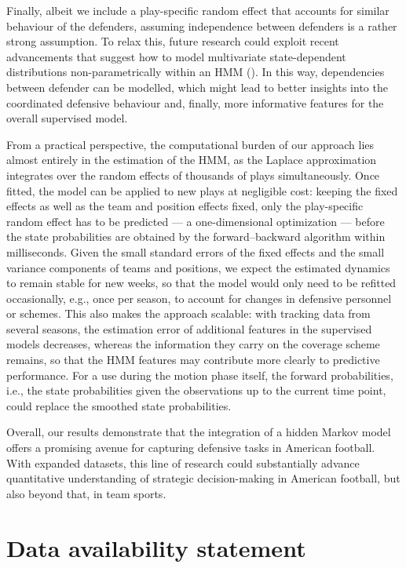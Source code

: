 \documentclass[namedate,webpdf,modern,medium]{oup-authoring-template}
\begin{document}
Finally, albeit we include a play-specific random effect that accounts for similar behaviour of the defenders, assuming independence between defenders is a rather strong assumption. To relax this, future research could exploit recent advancements that suggest how to model multivariate state-dependent distributions non-parametrically within an HMM (\citealp{koslik2025tensor, michels2025nonparametric}). In this way, dependencies between defender can be modelled, which might lead to better insights into the coordinated defensive behaviour and, finally, more informative features for the overall supervised model.

From a practical perspective, the computational burden of our approach lies almost entirely in the estimation of the HMM, as the Laplace approximation integrates over the random effects of thousands of plays simultaneously. Once fitted, the model can be applied to new plays at negligible cost: keeping the fixed effects as well as the team and position effects fixed, only the play-specific random effect has to be predicted --- a one-dimensional optimization --- before the state probabilities are obtained by the forward--backward algorithm within milliseconds. Given the small standard errors of the fixed effects and the small variance components of teams and positions, we expect the estimated dynamics to remain stable for new weeks, so that the model would only need to be refitted occasionally, e.g., once per season, to account for changes in defensive personnel or schemes. This also makes the approach scalable: with tracking data from several seasons, the estimation error of additional features in the supervised models decreases, whereas the information they carry on the coverage scheme remains, so that the HMM features may contribute more clearly to predictive performance. For a use during the motion phase itself, the forward probabilities, i.e., the state probabilities given the observations up to the current time point, could replace the smoothed state probabilities.

Overall, our results demonstrate that the integration of a hidden Markov model offers a promising avenue for capturing defensive tasks in American football. With expanded datasets, this line of research could substantially advance quantitative understanding of strategic decision-making in American football, but also beyond that, in team sports.

\section*{Data availability statement}
\end{document}
